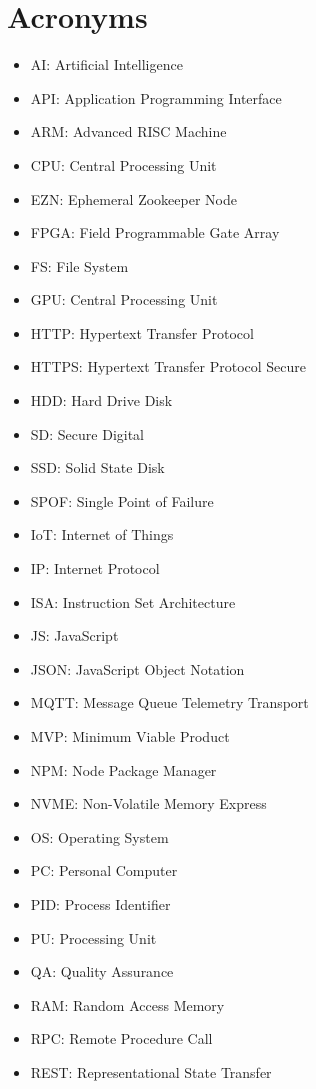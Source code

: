 \section*{Acronyms}
\begin{itemize}
    \item AI: Artificial Intelligence
    \item API: Application Programming Interface
    \item ARM: Advanced RISC Machine
    \item CPU: Central Processing Unit
    \item EZN: Ephemeral Zookeeper Node
    \item FPGA: Field Programmable Gate Array
    \item FS: File System
    \item GPU: Central Processing Unit
    \item HTTP: Hypertext Transfer Protocol
    \item HTTPS: Hypertext Transfer Protocol Secure
    \item HDD: Hard Drive Disk
    \item SD: Secure Digital
    \item SSD: Solid State Disk
    \item SPOF: Single Point of Failure
    \item IoT: Internet of Things
    \item IP: Internet Protocol
    \item ISA: Instruction Set Architecture
    \item JS: JavaScript
    \item JSON: JavaScript Object Notation
    \item MQTT: Message Queue Telemetry Transport
    \item MVP: Minimum Viable Product
    \item NPM: Node Package Manager
    \item NVME: Non-Volatile Memory Express
    \item OS: Operating System
    \item PC: Personal Computer
    \item PID: Process Identifier
    \item PU: Processing Unit
    \item QA: Quality Assurance
    \item RAM: Random Access Memory
    \item RPC: Remote Procedure Call
    \item REST: Representational State Transfer

\end{itemize}
